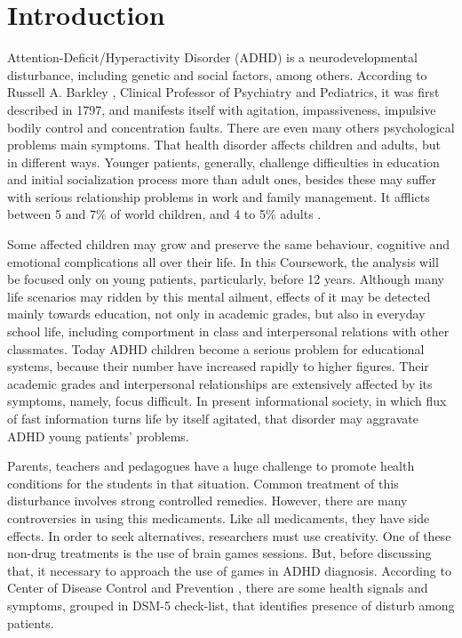 \chapter{Introduction}
\label{ch:introduction}

Attention-Deficit/Hyperactivity Disorder (ADHD) is a neurodevelopmental disturbance, including genetic and social factors, among others. According to Russell A. Barkley \citep{ADHDDay}, Clinical Professor of Psychiatry and Pediatrics, it was first described in 1797, and manifests itself with agitation, impassiveness, impulsive bodily control and concentration faults. There are even many others psychological problems main symptoms. That health disorder affects children and adults, but in different ways. Younger patients, generally, challenge difficulties in education and initial socialization process more than adult ones, besides these may suffer with serious relationship problems in work and family management. It afflicts between 5 and 7\% of world children, and 4 to 5\% adults \citep{ADHDDay}.

Some affected children may grow and preserve the same behaviour, cognitive and emotional complications all over their life. In this Coursework, the analysis will be focused only on young patients, particularly, before 12 years. Although many life scenarios may ridden by this mental ailment, effects of it may be detected mainly towards education, not only in academic grades, but also in everyday school life, including comportment in class and interpersonal relations with other classmates. Today ADHD children become a serious problem for educational systems, because their number have increased rapidly to higher figures. Their academic grades and interpersonal relationships are extensively affected by its symptoms, namely, focus difficult. In present informational society, in which flux of fast information turns life by itself agitated, that disorder may aggravate ADHD young patients' problems.  

Parents, teachers and pedagogues have a huge challenge to promote health conditions for the students in that situation. Common treatment of this disturbance involves strong controlled remedies. However, there are many controversies in using this medicaments. Like all medicaments, they have side effects. In order to seek alternatives, researchers must use creativity. One of these non-drug treatments is the use of brain games sessions.  But, before discussing that, it necessary to approach the use of games in ADHD diagnosis. According to Center of Disease Control and Prevention \citep{DSM-5}, there are some health signals and symptoms, grouped in DSM-5 check-list, that identifies presence of disturb among patients. 


